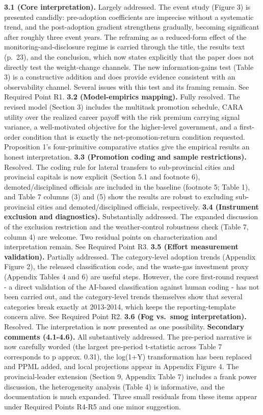 \documentclass[
  11pt,
]{article}
\begin{document}
\textbf{3.1 (Core interpretation).} Largely addressed. The event study
(Figure 3) is presented candidly: pre-adoption coefficients are
imprecise without a systematic trend, and the post-adoption gradient
strengthens gradually, becoming significant after roughly three event
years. The reframing as a reduced-form effect of the
monitoring-and-disclosure regime is carried through the title, the
results text (p.~23), and the conclusion, which now states explicitly
that the paper does not directly test the weight-change channels. The
new information-gains test (Table 3) is a constructive addition and does
provide evidence consistent with an observability channel. Several
issues with this test and its framing remain. See Required Point R1.
\textbf{3.2 (Model-empirics mapping).} Fully resolved. The revised model
(Section 3) includes the multitask promotion schedule, CARA utility over
the realized career payoff with the risk premium carrying signal
variance, a well-motivated objective for the higher-level government,
and a first-order condition that is exactly the net-promotion-return
condition requested. Proposition 1's four-primitive comparative statics
give the empirical results an honest interpretation. \textbf{3.3
(Promotion coding and sample restrictions).} Resolved. The coding rule
for lateral transfers to sub-provincial cities and provincial capitals
is now explicit (Section 5.1 and footnote 6), demoted/disciplined
officials are included in the baseline (footnote 5; Table 1), and Table
7 columns (3) and (5) show the results are robust to excluding
sub-provincial cities and demoted/disciplined officials, respectively.
\textbf{3.4 (Instrument exclusion and diagnostics).} Substantially
addressed. The expanded discussion of the exclusion restriction and the
weather-control robustness check (Table 7, column 4) are welcome. Two
residual points on characterization and interpretation remain. See
Required Point R3. \textbf{3.5 (Effort measurement validation).}
Partially addressed. The category-level adoption trends (Appendix Figure
2), the released classification code, and the waste-gas investment proxy
(Appendix Tables 4 and 6) are useful steps. However, the core
first-round request - a direct validation of the AI-based classification
against human coding - has not been carried out, and the category-level
trends themselves show that several categories break exactly at
2013-2014, which keeps the reporting-template concern alive. See
Required Point R2. \textbf{3.6 (Fog vs.~smog interpretation).} Resolved.
The interpretation is now presented as one possibility.
\textbf{Secondary comments (4.1-4.6).} All substantively addressed. The
pre-period narrative is now carefully worded (the largest pre-period
t-statistic across Table 7 corresponds to p approx. 0.31), the log(1+Y)
transformation has been replaced and PPML added, and local projections
appear in Appendix Figure 4. The provincial-leader extension (Section 9,
Appendix Table 7) includes a frank power discussion, the heterogeneity
analysis (Table 4) is informative, and the documentation is much
expanded. Three small residuals from these items appear under Required
Points R4-R5 and one minor suggestion.
\end{document}
